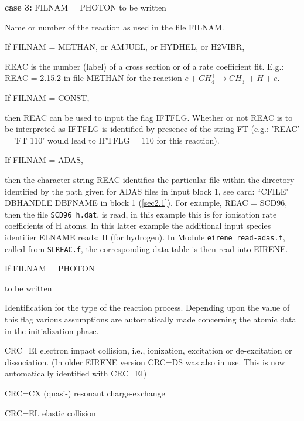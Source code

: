 \begin{description}
        \textbf{case 3:} FILNAM = PHOTON to be written

  \item[REAC] Name or number of the reaction as used in the file FILNAM.

        If FILNAM = METHAN, or AMJUEL, or HYDHEL, or H2VIBR,

        REAC is the number (label) of a cross section or of a rate coefficient fit.
        E.g.: REAC = 2.15.2 in file METHAN for the reaction $ e + CH_4^+ \rightarrow
          CH_3^+ + H + e $.

        If FILNAM = CONST,

        then REAC can be used to input the flag IFTFLG.
        Whether or not REAC is to be interpreted as IFTFLG is identified by presence of
        the string FT  (e.g.: 'REAC' = 'FT 110' would lead to IFTFLG = 110 for this
        reaction).

        If FILNAM = ADAS,

        then the character string REAC identifies the particular file within the
        directory identified by the path given for \ac{ADAS} files in input block 1,
        see card: ``CFILE" DBHANDLE DBFNAME in block 1 (\cref{sec2.1}).
        For example, REAC = SCD96, then the file \lstinline|SCD96_h.dat|, is read, in
        this example this is for ionisation rate coefficients of H atoms.
        In this latter example the additional input species identifier ELNAME reads: H
        (for hydrogen).
        In Module \lstinline|eirene_read-adas.f|, called from \lstinline|SLREAC.f|, the
        corresponding data table is then read into EIRENE.

        If FILNAM = PHOTON

        to be written

  \item[CRC] Identification for the type of the reaction process.
        Depending upon the value of this flag various assumptions are automatically
        made concerning the atomic data in the initialization phase.

        \medskip

        CRC=EI electron impact collision, i.e., ionization, excitation or de-excitation
        or dissociation.
        (In older EIRENE version CRC=DS was also in use.
        This is now automatically identified with CRC=EI)

        CRC=CX (quasi-) resonant charge-exchange

        CRC=EL elastic collision


\end{description}
